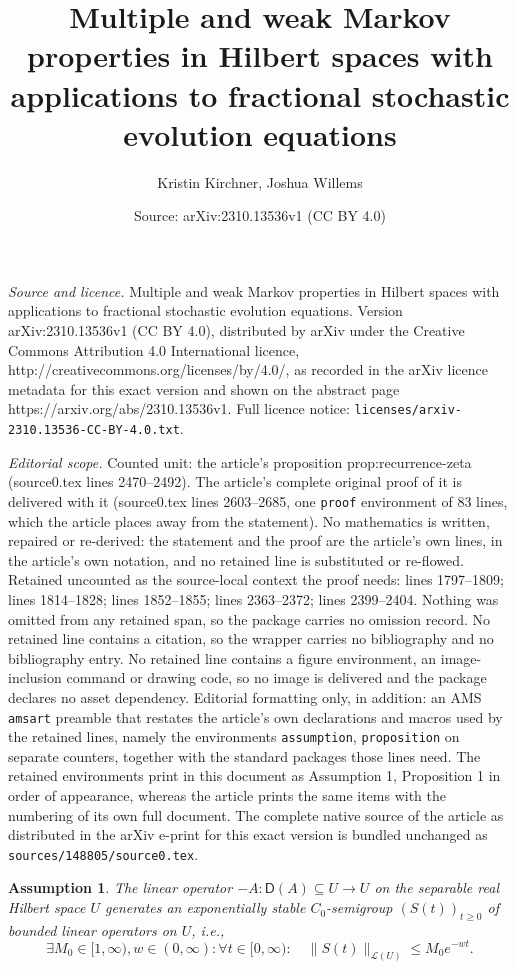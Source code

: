 \documentclass[10pt,a4paper]{amsart}
\title{Multiple and weak Markov properties in Hilbert spaces with applications to fractional stochastic evolution equations}
\author{Kristin Kirchner, Joshua Willems}
\date{Source: arXiv:2310.13536v1 (CC BY 4.0)}
\newtheorem{assumption}{Assumption}
\newcommand{\from}{\colon}
\newcommand{\norm}[2]{     \| #1       \|_{ #2 }}
\begin{document}
\maketitle

\noindent\emph{Source and licence.} Multiple and weak Markov properties in Hilbert spaces with applications to fractional stochastic evolution equations. Version arXiv:2310.13536v1 (CC BY 4.0), distributed by arXiv under the Creative Commons Attribution 4.0 International licence, http://creativecommons.org/licenses/by/4.0/, as recorded in the arXiv licence metadata for this exact version and shown on the abstract page https://arxiv.org/abs/2310.13536v1. Full licence notice: \texttt{licenses/arxiv-2310.13536-CC-BY-4.0.txt}.\par\smallskip

\noindent\textit{Editorial scope.} Counted unit: the article's proposition prop:recurrence-zeta (source0.tex lines 2470--2492). The article's complete original proof of it is delivered with it (source0.tex lines 2603--2685, one \texttt{proof} environment of 83 lines, which the article places away from the statement). No mathematics is written, repaired or re-derived: the statement and the proof are the article's own lines, in the article's own notation, and no retained line is substituted or re-flowed.  Retained uncounted as the source-local context the proof needs: lines 1797--1809; lines 1814--1828; lines 1852--1855; lines 2363--2372; lines 2399--2404.  Nothing was omitted from any retained span, so the package carries no omission record.  No retained line contains a citation, so the wrapper carries no bibliography and no bibliography entry.  No retained line contains a figure environment, an image-inclusion command or drawing code, so no image is delivered and the package declares no asset dependency.  Editorial formatting only, in addition: an AMS \texttt{amsart} preamble that restates the article's own declarations and macros used by the retained lines, namely the environments \texttt{assumption}, \texttt{proposition} on separate counters, together with the standard packages those lines need.  The retained environments print in this document as Assumption 1, Proposition 1 in order of appearance, whereas the article prints the same items with the numbering of its own full document.  The complete native source of the article as distributed in the arXiv e-print for this exact version is bundled unchanged as \texttt{sources/148805/source0.tex}.
\begin{assumption}\label{ass:standing}
	The linear operator
	$-A \from \mathsf D(A) \subseteq U \to U$
	on the separable real Hilbert space $U$ generates an
	\emph{exponentially stable} $C_0$-semigroup $(S(t))_{t\ge0}$ of bounded
	linear operators on $U$, i.e.,
	\begin{equation}\label{eq:semigroup-est}
		\exists M_0 \in [1,\infty), w \in (0, \infty) : \forall t \in [0,\infty) : \quad
		\norm{S(t)}{\mathscr L(U)} \le M_0 e^{-wt}.
	\end{equation}
\end{assumption}
\end{document}
